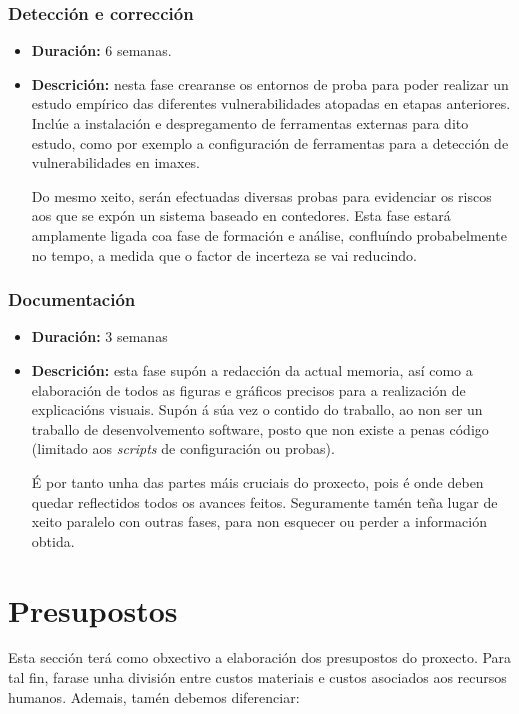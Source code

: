 \subsubsection{Detección e corrección}

\begin{itemize}
    \item \textbf{Duración:} 6 semanas.
    \item \textbf{Descrición:} nesta fase crearanse os entornos de proba para poder realizar un estudo empírico das diferentes vulnerabilidades atopadas en etapas anteriores. Inclúe a instalación e despregamento de ferramentas externas para dito estudo, como por exemplo a configuración de ferramentas para a detección de vulnerabilidades en imaxes.
    
    Do mesmo xeito, serán efectuadas diversas probas para evidenciar os riscos aos que se expón un sistema baseado en contedores. Esta fase estará amplamente ligada coa fase de formación e análise, confluíndo probabelmente no tempo, a medida que o factor de incerteza se vai reducindo.
\end{itemize}

\subsubsection{Documentación}

\begin{itemize}
    \item \textbf{Duración:} 3 semanas
    \item \textbf{Descrición:} esta fase supón a redacción da actual memoria, así como a elaboración de todos as figuras e gráficos precisos para a realización de explicacións visuais. Supón á súa vez o contido do traballo, ao non ser un traballo de desenvolvemento software, posto que non existe a penas código (limitado aos \textit{scripts} de configuración ou probas).
    
    É por tanto unha das partes máis cruciais do proxecto, pois é onde deben quedar reflectidos todos os avances feitos. Seguramente tamén teña lugar de xeito paralelo con outras fases, para non esquecer ou perder a información obtida.
\end{itemize}

\section{Presupostos}

Esta sección terá como obxectivo a elaboración dos presupostos do proxecto. Para tal fin, farase unha división entre custos materiais e custos asociados aos recursos humanos. Ademais, tamén debemos diferenciar:

